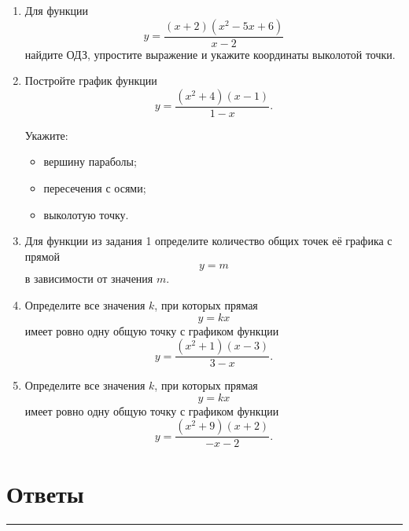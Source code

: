 \documentclass[a4paper,12pt]{article}
\newcommand{\sectionrule}{%
    \par
    \vspace{-0.4em}
    {\color{accent}\rule{\linewidth}{0.5pt}}
    \vspace{0.4em}
}
\begin{document}
\begin{enumerate}

\item
Для функции
\[
y=
\frac{(x+2)(x^2-5x+6)}{x-2}
\]
найдите ОДЗ, упростите выражение и укажите координаты выколотой точки.

\item
Постройте график функции
\[
y=
\frac{(x^2+4)(x-1)}{1-x}.
\]

Укажите:

\begin{itemize}
\item вершину параболы;
\item пересечения с осями;
\item выколотую точку.
\end{itemize}

\item
Для функции из задания 1 определите количество общих точек её графика с прямой
\[
y=m
\]
в зависимости от значения $m$.

\item
Определите все значения $k$, при которых прямая
\[
y=kx
\]
имеет ровно одну общую точку с графиком функции
\[
y=
\frac{(x^2+1)(x-3)}{3-x}.
\]

\item
Определите все значения $k$, при которых прямая
\[
y=kx
\]
имеет ровно одну общую точку с графиком функции
\[
y=
\frac{(x^2+9)(x+2)}{-x-2}.
\]

\end{enumerate}


\clearpage

\section*{Ответы}
\sectionrule

\renewcommand{\arraystretch}{1.35}
\end{document}
